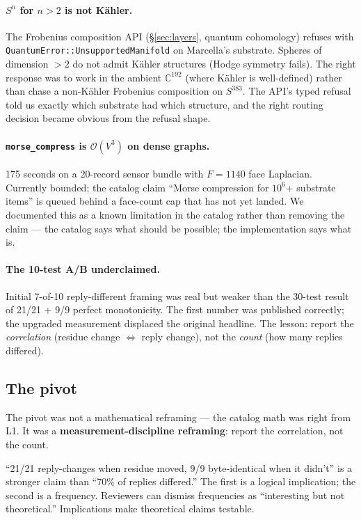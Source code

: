 \documentclass[11pt,letterpaper]{article}
\begin{document}
\paragraph{$S^n$ for $n > 2$ is not K\"ahler.} The Frobenius
composition API (\S\ref{sec:layers}, quantum cohomology) refuses with
\texttt{QuantumError::UnsupportedManifold} on Marcella's substrate.
Spheres of dimension $> 2$ do not admit K\"ahler structures (Hodge
symmetry fails). The right response was to work in the ambient
$\mathbb{C}^{192}$ (where K\"ahler is well-defined) rather than chase
a non-K\"ahler Frobenius composition on $S^{383}$. The API's typed
refusal told us exactly which substrate had which structure, and the
right routing decision became obvious from the refusal shape.

\paragraph{\texttt{morse\_compress} is $\mathcal{O}(V^3)$ on dense
graphs.} 175 seconds on a 20-record sensor bundle with $F = 1140$
face Laplacian. Currently bounded; the catalog claim ``Morse
compression for $10^6$+ substrate items'' is queued behind a
face-count cap that has not yet landed. We documented this as a
known limitation in the catalog rather than removing the claim --- the
catalog says what should be possible; the implementation says what
is.

\paragraph{The 10-test A/B underclaimed.} Initial 7-of-10
reply-different framing was real but weaker than the 30-test result
of 21/21 + 9/9 perfect monotonicity. The first number was published
correctly; the upgraded measurement displaced the original headline.
The lesson: report the \emph{correlation} (residue change
$\Leftrightarrow$ reply change), not the \emph{count} (how many
replies differed).

\subsection{The pivot}

The pivot was not a mathematical reframing --- the catalog math was
right from L1. It was a \textbf{measurement-discipline reframing}:
report the correlation, not the count.

``21/21 reply-changes when residue moved, 9/9 byte-identical when it
didn't'' is a stronger claim than ``70\% of replies differed.'' The
first is a logical implication; the second is a frequency. Reviewers
can dismiss frequencies as ``interesting but not theoretical.''
Implications make theoretical claims testable.
\end{document}
